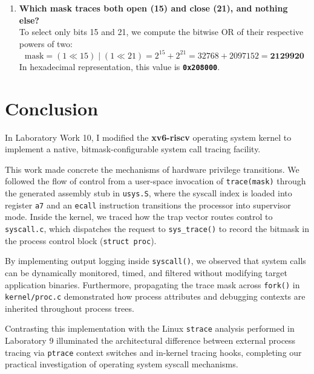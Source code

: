 \documentclass{labreport}
\begin{document}
\begin{enumerate}[leftmargin=*]
    \item \textbf{Which mask traces both open (15) and close (21), and nothing else?}\\[0.2em]
    To select only bits 15 and 21, we compute the bitwise OR of their respective powers of two:
    \[
    \text{mask} = (1 \ll 15) \mid (1 \ll 21) = 2^{15} + 2^{21} = 32768 + 2097152 = \mathbf{2129920}
    \]
    In hexadecimal representation, this value is \textbf{\texttt{0x208000}}.
\end{enumerate}

\section{Conclusion}

In Laboratory Work 10, I modified the \textbf{xv6-riscv} operating system kernel to implement a native, bitmask-configurable system call tracing facility.

This work made concrete the mechanisms of hardware privilege transitions. We followed the flow of control from a user-space invocation of \texttt{trace(mask)} through the generated assembly stub in \texttt{usys.S}, where the syscall index is loaded into register \texttt{a7} and an \texttt{ecall} instruction transitions the processor into supervisor mode. Inside the kernel, we traced how the trap vector routes control to \texttt{syscall.c}, which dispatches the request to \texttt{sys\_trace()} to record the bitmask in the process control block (\texttt{struct proc}).

By implementing output logging inside \texttt{syscall()}, we observed that system calls can be dynamically monitored, timed, and filtered without modifying target application binaries. Furthermore, propagating the trace mask across \texttt{fork()} in \texttt{kernel/proc.c} demonstrated how process attributes and debugging contexts are inherited throughout process trees.

Contrasting this implementation with the Linux \texttt{strace} analysis performed in Laboratory 9 illuminated the architectural difference between external process tracing via \texttt{ptrace} context switches and in-kernel tracing hooks, completing our practical investigation of operating system syscall mechanisms.
\end{document}

